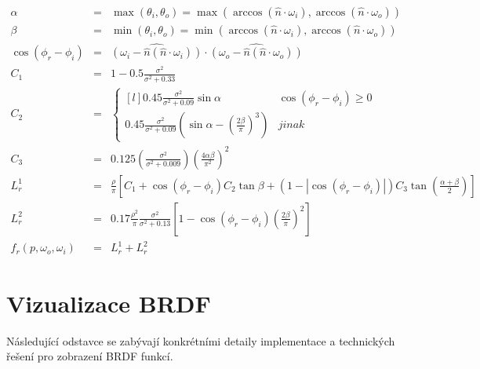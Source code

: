 \documentclass[czech,master,dept460,male,cpp,cpdeclaration]{diploma}
\newcommand{\uvec}[1]{\hat{#1}}
\newcommand{\point}{p}
\newcommand{\brdf}{f_r\left(\point,\omega_{o},\omega_{i}\right)}
\newcommand{\normVec}{\uvec{n}}
\newcommand{\inVec}{\omega_{i}}
\newcommand{\outVec}{\omega_{o}}
\newcommand{\alb}{\rho}
\newcommand{\rough}{\sigma}
\begin{document}
\newcommand{\cosphiri}{\cos\left(\phi_r-\phi_i\right)}

\begin{eqnarray}
    \alpha & = & \max(\theta_i , \theta_o) = \max(\arccos(\normVec\cdot\inVec), \arccos(\normVec\cdot\outVec)) \nonumber \\
    \beta & = & \min(\theta_i , \theta_o) = \min(\arccos(\normVec\cdot\inVec), \arccos(\normVec\cdot\outVec)) \nonumber \\
    \cosphiri & = & \widehat{\left( \inVec - \normVec(\normVec\cdot\inVec) \right)} \cdot \widehat{\left( \outVec - \normVec(\normVec\cdot\outVec)  \right)} \nonumber \\
    C_1 & = & 1-0.5\frac{\rough^2}{\rough^2 + 0.33} \nonumber \\
    C_2 & = & \left\{\begin{matrix*}[l] 0.45\frac{\rough^2}{\rough^2+0.09}\sin\alpha & \cosphiri \geq 0\\ 0.45\frac{\rough^2}{\rough^2+0.09}\left(\sin\alpha-\left(\frac{2\beta}{\pi}\right)^3\right) & jinak \end{matrix*}\right. \nonumber \\
    C_3 & = & 0.125\left(\frac{\rough^2}{\rough^2 + 0.009}\right)\left(\frac{4\alpha\beta}{\pi^2}\right)^2 \nonumber \\
    L^{1}_{r} & = & \frac{\alb}{\pi}\left[C_1 + \cosphiri C_2\tan\beta + \left( 1-\left | \cosphiri  \right | \right)C_3\tan \left(\frac{\alpha+\beta}{2}\right)\right] \nonumber \\
    L^{2}_{r} & = & 0.17\frac{\alb^2}{\pi}\frac{\rough^2}{\rough^2+0.13}\left[1 - \cosphiri  \left(\frac{2\beta}{\pi}\right)^2 \right] \nonumber \\
    \brdf & = & L^{1}_{r} + L^{2}_{r} \label{eq:OrenNayar}
\end{eqnarray}

\clearpage
\section{Vizualizace BRDF}
Následující odstavce se zabývají konkrétními detaily implementace a technických řešení pro zobrazení BRDF funkcí.
\end{document}
